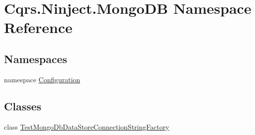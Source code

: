 \hypertarget{namespaceCqrs_1_1Ninject_1_1MongoDB}{}\section{Cqrs.\+Ninject.\+Mongo\+DB Namespace Reference}
\label{namespaceCqrs_1_1Ninject_1_1MongoDB}
\subsection*{Namespaces}
\begin{DoxyCompactItemize}
\item 
namespace \hyperlink{namespaceCqrs_1_1Ninject_1_1MongoDB_1_1Configuration}{Configuration}
\end{DoxyCompactItemize}
\subsection*{Classes}
\begin{DoxyCompactItemize}
\item 
class \hyperlink{classCqrs_1_1Ninject_1_1MongoDB_1_1TestMongoDbDataStoreConnectionStringFactory}{Test\+Mongo\+Db\+Data\+Store\+Connection\+String\+Factory}
\end{DoxyCompactItemize}
